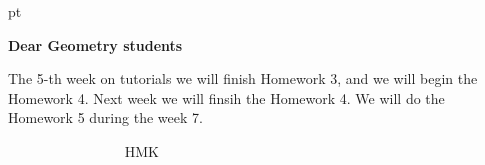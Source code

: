 

 pt
   \centerline {\bf Dear Geometry students}
\noindent The 5-th week on tutorials we will finish Homework 3,
  and we will begin the Homework 4. Next week we will finsih the Homework 4.
   We will do the Homework 5 during the week 7.

           $\qquad\qquad\qquad\qquad$    HMK

                     \bye 
